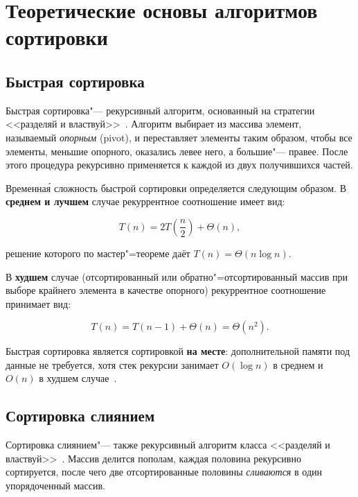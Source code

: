 \section{Теоретические основы алгоритмов сортировки}

\subsection{Быстрая сортировка}

Быстрая сортировка"--- рекурсивный алгоритм, основанный на стратегии
<<разделяй и властвуй>>~\cite{cormen2009}. Алгоритм выбирает из массива
элемент, называемый \textit{опорным} (pivot), и переставляет элементы
таким образом, чтобы все элементы, меньшие опорного, оказались левее него,
а большие"--- правее. После этого процедура рекурсивно применяется к
каждой из двух получившихся частей.

Временна\'я сложность быстрой сортировки определяется следующим образом.
В \textbf{среднем и лучшем} случае рекуррентное соотношение имеет вид:

\begin{equation}
    T(n) = 2T\!\left(\frac{n}{2}\right) + \Theta(n),
    \label{eq:qs_avg}
\end{equation}

\noindent решение которого по мастер"=теореме даёт $T(n) = \Theta(n \log n)$.

В \textbf{худшем} случае (отсортированный или обратно"=отсортированный массив
при выборе крайнего элемента в качестве опорного) рекуррентное соотношение
принимает вид:

\begin{equation}
    T(n) = T(n - 1) + \Theta(n) = \Theta(n^2).
    \label{eq:qs_worst}
\end{equation}

Быстрая сортировка является сортировкой \textbf{на месте}: дополнительной
памяти под данные не требуется, хотя стек рекурсии занимает $O(\log n)$
в среднем и $O(n)$ в худшем случае~\cite{sedgewick2011}.

\subsection{Сортировка слиянием}

Сортировка слиянием"--- также рекурсивный алгоритм класса <<разделяй
и властвуй>>~\cite{knuth1998}. Массив делится пополам, каждая половина
рекурсивно сортируется, после чего две отсортированные половины
\textit{сливаются} в один упорядоченный массив.

